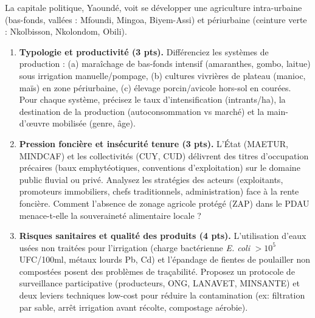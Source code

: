\documentclass[11pt]{article}
\begin{document}
\begin{exercice}
\label{exo:aup}
La capitale politique, Yaoundé, voit se développer une agriculture intra-urbaine (bas-fonds, vallées : Mfoundi, Mingoa, Biyem-Assi) et périurbaine (ceinture verte : Nkolbisson, Nkolondom, Obili).
\begin{enumerate}
    \item \textbf{Typologie et productivité (3 pts).} Différenciez les systèmes de production : (a) maraîchage de bas-fonds intensif (amaranthes, gombo, laitue) sous irrigation manuelle/pompage, (b) cultures vivrières de plateau (manioc, maïs) en zone périurbaine, (c) élevage porcin/avicole hors-sol en courées. Pour chaque système, précisez le taux d'intensification (intrants/ha), la destination de la production (autoconsommation vs marché) et la main-d'œuvre mobilisée (genre, âge).
    \item \textbf{Pression foncière et insécurité tenure (3 pts).} L'État (MAETUR, MINDCAF) et les collectivités (CUY, CUD) délivrent des titres d'occupation précaires (baux emphytéotiques, conventions d'exploitation) sur le domaine public fluvial ou privé. Analysez les stratégies des acteurs (exploitants, promoteurs immobiliers, chefs traditionnels, administration) face à la rente foncière. Comment l'absence de zonage agricole protégé (ZAP) dans le PDAU menace-t-elle la souveraineté alimentaire locale ?
    \item \textbf{Risques sanitaires et qualité des produits (4 pts).} L'utilisation d'eaux usées non traitées pour l'irrigation (charge bactérienne \textit{E. coli} $> 10^5$ UFC/100ml, métaux lourds Pb, Cd) et l'épandage de fientes de poulailler non compostées posent des problèmes de traçabilité. Proposez un protocole de surveillance participative (producteurs, ONG, LANAVET, MINSANTE) et deux leviers techniques low-cost pour réduire la contamination (ex: filtration par sable, arrêt irrigation avant récolte, compostage aérobie).
\end{enumerate}
\end{exercice}
\end{document}
